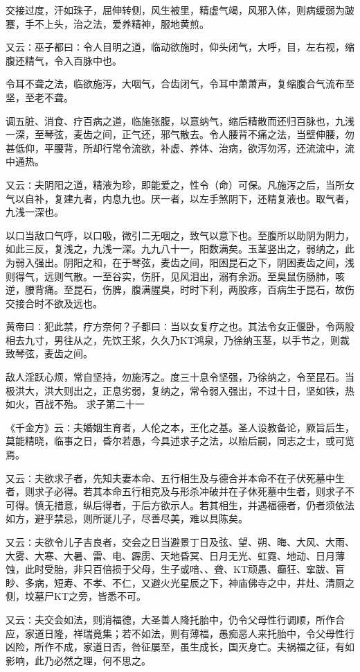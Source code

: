 \documentclass[a4paper,12pt,UTF8,twoside]{ctexbook}
\begin{document}
交接过度，汗如珠子，屈伸转侧，风生被里，精虚气竭，风邪入体，则病缓弱为跛蹇，手不上头，治之法，爱养精神，服地黄煎。

又云∶巫子都曰∶令人目明之道，临动欲施时，仰头闭气，大呼，目，左右视，缩腹还精气，令入百脉中也。

令耳不聋之法，临欲施泻，大咽气，合齿闭气，令耳中萧萧声，复缩腹合气流布至坚，至老不聋。

调五脏、消食、疗百病之道，临施张腹，以意纳气，缩后精散而还归百脉也，九浅一深，至琴弦，麦齿之间，正气还，邪气散去。令人腰背不痛之法，当壁伸腰，勿甚低仰，平腰背，所却行常令流欲，补虚、养体、治病，欲泻勿泻，还流流中，流中通热。

又云∶夫阴阳之道，精液为珍，即能爱之，性令（命）可保。凡施泻之后，当所女气以自补，复建九者，内息九也。厌一者，以左手煞阴下，还精复液也。取气者，九浅一深也。

以口当敌口气呼，以口吸，微引二无咽之，致气以意下也。至腹所以助阴为阴力，如此三反，复浅之，九浅一深。九九八十一，阳数满矣。玉茎竖出之，弱纳之，此为弱入强出。阴阳之和，在于琴弦，麦齿之间，阳困昆石之下，阴困麦齿之间，浅则得气，远则气散。一至谷实，伤肝，见风泪出，溺有余沥。至臭鼠伤肠肺，咳逆，腰背痛。至昆石，伤脾，腹满腥臭，时时下利，两股疼，百病生于昆石，故伤交接合时不欲及远也。

黄帝曰∶犯此禁，疗方奈何？子都曰∶当以女复疗之也。其法令女正偃卧，令两股相去九寸，男往从之，先饮王浆，久久乃KT鸿泉，乃徐纳玉茎，以手节之，则裁致琴弦，麦齿之间。

敌人淫跃心烦，常自坚持，勿施泻之。度三十息令坚强，乃徐纳之，令至昆石。当极洪大，洪大则出之，正息劣弱，复纳之，常令弱入强出，不过十日，坚如铁，热如火，百战不殆。
求子第二十一

《千金方》云∶夫婚姻生育者，人伦之本，王化之基。圣人设教备论，厥旨后生，莫能精晓，临事之日，昏尔若愚，今具述求子之法，以贻后嗣，同志之士，或可览焉。

又云∶夫欲求子者，先知夫妻本命、五行相生及与德合并本命不在子伏死墓中生者，则求子必得。若其本命五行相克及与形杀冲破并在子休死墓中生者，则求子不可得。慎无措意，纵后得者，于后方欲示人。若其相生，并遇福德者，仍者须依法如方，避乎禁忌，则所诞儿子，尽善尽美，难以具陈矣。

又云∶夫欲令儿子吉良者，交会之日当避景丁日及弦、望、朔、晦、大风、大雨、大雾、大寒、大暑、雷、电、霹雳、天地昏冥、日月无光、虹霓、地动、日月薄蚀，此时受胎，非只百倍损于父母，生子或喑、、聋、KT顽愚、癫狂、挛跋、盲眇、多病，短寿、不孝、不仁，又避火光星辰之下，神庙佛寺之中，井灶、清厕之侧，坟墓尸KT之旁，皆悉不可。

又云∶夫交会如法，则消福德，大圣善人降托胎中，仍令父母性行调顺，所作合应，家道日隆，祥瑞竟集；若不如法，则有薄福，愚痴恶人来托胎中，令父母性行凶险，所作不成，家道日否，咎征屡至，虽生成长，国灭身亡。夫祸福之征，有如影响，此乃必然之理，何不思之。
\end{document}
